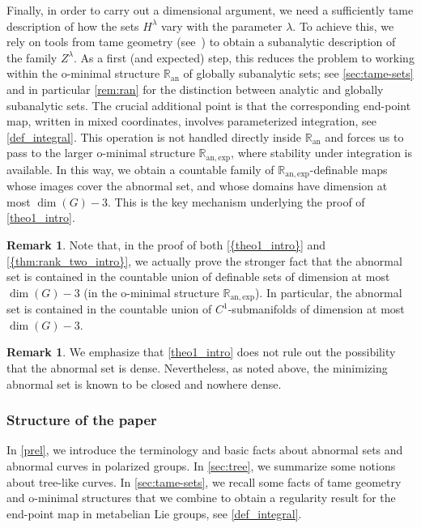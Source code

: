 \documentclass[a4paper,11pt,reqno]{amsart}
\theoremstyle{plain}
\theoremstyle{definition}
\newtheorem{remark}[theorem]{Remark}
\newcommand{\Ran}{\mathbb R_{\mathrm{an}}}
\newcommand{\Ranexp}{\mathbb R_{\mathrm{an,exp}}}
\begin{document}
Finally, in order to carry out a dimensional argument, we need a sufficiently tame description of how the sets $H^\lambda$ vary with the parameter $\lambda$. To achieve this, we rely on tools from tame geometry (see~\cite{MR1633348}) to obtain a subanalytic description of the family $Z^\lambda$. As a first (and expected) step, this reduces the problem to working within the o-minimal structure $\mathbb{R}_{\mathrm{an}}$ of globally subanalytic sets; see \cref{sec:tame-sets} and in particular \cref{rem:ran} for the distinction between analytic and globally subanalytic sets.
 The crucial additional point is that the corresponding end-point map, written in mixed coordinates, involves parameterized integration, see \cref{def_integral}. This operation is not handled directly inside $\Ran$ and forces us to pass to the larger o-minimal structure $\Ranexp$, where stability under integration is available. In this way, we obtain a countable family of $\Ranexp$-definable maps whose images cover the abnormal set, and whose domains have dimension at most $\dim(G)-3$. This is the key mechanism underlying the proof of \cref{theo1_intro}.

  \begin{remark}
     Note that, in the proof of both \cref{{theo1_intro}} and \cref{{thm:rank_two_intro}}, we actually prove the stronger fact that the abnormal set is contained in the countable union of definable sets of dimension at most $\dim(G)-3$  (in the o-minimal structure $\Ranexp$). In particular, the abnormal set is contained in the countable union of $C^1$-submanifolds of dimension at most $\dim(G)-3$.
 \end{remark}

 \begin{remark}
   We emphasize that \cref{theo1_intro} does not rule out the possibility that the abnormal set is dense. Nevertheless, as noted above, the minimizing abnormal set is known to be closed and nowhere dense.
\end{remark}

\medskip

\subsubsection*{\bf Structure of the paper} In \cref{prel}, we introduce the terminology and basic facts about abnormal sets and abnormal curves in polarized groups. In \cref{sec:tree}, we summarize some notions about tree-like curves. In \cref{sec:tame-sets}, we recall some facts of tame geometry and o-minimal structures that we combine  to obtain a regularity result for the end-point map in metabelian Lie groups, see \cref{def_integral}.
\end{document}
